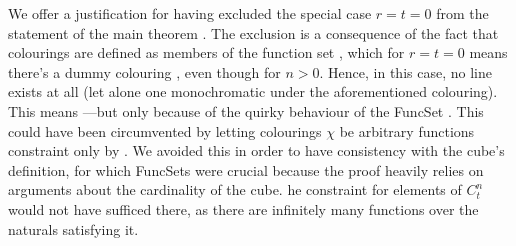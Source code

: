 \begin{isabellebody}
%
\endisatagproof
{\isafoldproof}%
%
\isadelimproof
%
\endisadelimproof
%
\begin{isamarkuptext}%
We offer a justification for having excluded the special case $r = t = 0$ from the statement of the main theorem . The exclusion is a consequence of the fact that colourings are defined as members of the function set , which for $r = t = 0$ means there's a dummy colouring , even though  for $n > 0$. Hence, in this case, no line exists at all (let alone one monochromatic under the aforementioned colouring). This means ---but only because of the quirky behaviour of the FuncSet . This could have been circumvented by letting colourings $\chi$ be arbitrary functions constraint only by . We avoided this in order to have consistency with the cube's definition, for which FuncSets were crucial because the proof heavily relies on arguments about the cardinality of the cube. he constraint  for elements  of $C^n_t$ would not have sufficed there, as there are infinitely many functions over the naturals satisfying it.%
\end{isamarkuptext}\isamarkuptrue%
%
\isadelimtheory
%
\endisadelimtheory
%
\isatagtheory
{}\isamarkupfalse%
%
\endisatagtheory
{\isafoldtheory}%
%
\isadelimtheory
%
\endisadelimtheory
%
\end{isabellebody}%
\endinput
